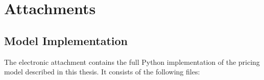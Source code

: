 \documentclass[12pt,a4paper]{report}
\begin{document}



\tableofcontents











\listoffigures

\listoftables



\appendix
\chapter{Attachments}

\section{Model Implementation}
\label{app:code}

The electronic attachment contains the full Python implementation of the pricing model described in this thesis. It consists of the following files:
\end{document}
